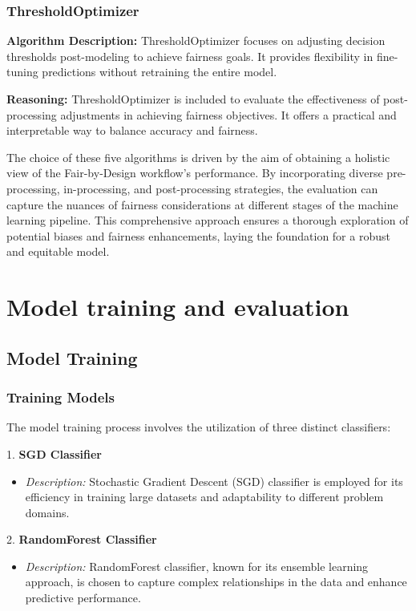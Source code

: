 \subsubsection{ThresholdOptimizer}

\textbf{Algorithm Description:} ThresholdOptimizer focuses on adjusting decision thresholds post-modeling to achieve fairness goals. It provides flexibility in fine-tuning predictions without retraining the entire model.

\textbf{Reasoning:} ThresholdOptimizer is included to evaluate the effectiveness of post-processing adjustments in achieving fairness objectives. It offers a practical and interpretable way to balance accuracy and fairness.

The choice of these five algorithms is driven by the aim of obtaining a holistic view of the Fair-by-Design workflow's performance. By incorporating diverse pre-processing, in-processing, and post-processing strategies, the evaluation can capture the nuances of fairness considerations at different stages of the machine learning pipeline. This comprehensive approach ensures a thorough exploration of potential biases and fairness enhancements, laying the foundation for a robust and equitable model.

\section{Model training and evaluation}
\label{section:val_mt_eval}

\subsection{Model Training}

\subsubsection{Training Models}

The model training process involves the utilization of three distinct classifiers:

1. \textbf{SGD Classifier}
   \begin{itemize}
       \item \textit{Description:} Stochastic Gradient Descent (SGD) classifier is employed for its efficiency in training large datasets and adaptability to different problem domains.
   \end{itemize}

2. \textbf{RandomForest Classifier}
   \begin{itemize}
       \item \textit{Description:} RandomForest classifier, known for its ensemble learning approach, is chosen to capture complex relationships in the data and enhance predictive performance.
   \end{itemize}

